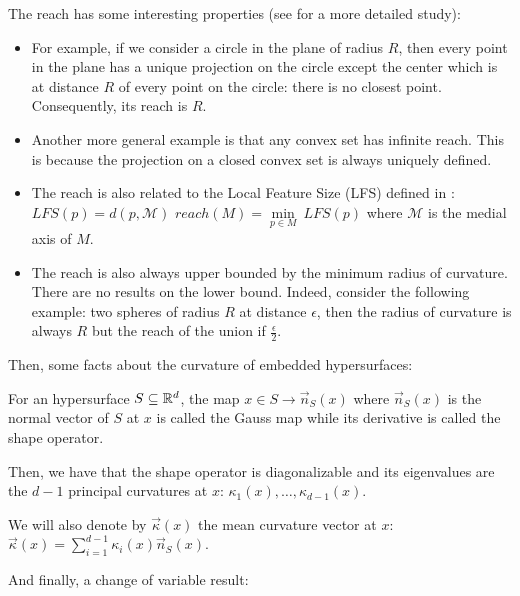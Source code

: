 The reach has some interesting properties (see \cite{merigot2009detection} for a
more detailed study):

\begin{itemize}
    \item For example, if we consider a circle in the plane of radius $ R $,
        then every point in the plane has a unique projection on the circle
        except the center which is at distance $ R $ of every point on the
        circle: there is no closest point.  Consequently, its reach is $ R $.

    \item Another more general example is that any convex set has infinite
        reach. This is because the projection on a closed convex set is always
        uniquely defined.

    \item The reach is also related to the Local Feature Size (LFS) defined in
        \cite{amenta1999surface}: $ LFS(p) = d(p, \mathcal{M}) $ $ reach(M) =
        \min\limits_{p \in M}~LFS(p) $ where $ \mathcal{M}  $ is the medial axis
        of $ M $.

    \item The reach is also always upper bounded by the minimum radius of
        curvature. There are no results on the lower bound. Indeed, consider the
        following example: two spheres of radius $ R $ at distance $ \epsilon $,
        then the radius of curvature is always $ R $ but the reach of the union
        if $ \frac{\epsilon}{2} $.
\end{itemize}

Then, some facts about the curvature of embedded hypersurfaces:

\begin{proposition}
    For an hypersurface $ S \subseteq \mathbb{R}^d $, the map $ x \in S \rightarrow
    \vec{n}_S(x) $ where $ \vec{n}_S(x) $ is the normal vector of $ S $ at $ x $ is
    called the Gauss map while its derivative is called the shape operator.

    Then, we have that the shape operator is diagonalizable and its eigenvalues
    are the $ d-1 $ principal curvatures at $ x $: $ \kappa_1(x), \ldots,
    \kappa_{d-1}(x) $.

    We will also denote by $ \vec{\kappa}(x) $ the mean curvature vector at $ x
    $: $ \vec{\kappa}(x) = \sum_{i=1}^{d-1} \kappa_i(x) \vec{n}_S(x) $.
\end{proposition}

And finally, a change of variable result:

